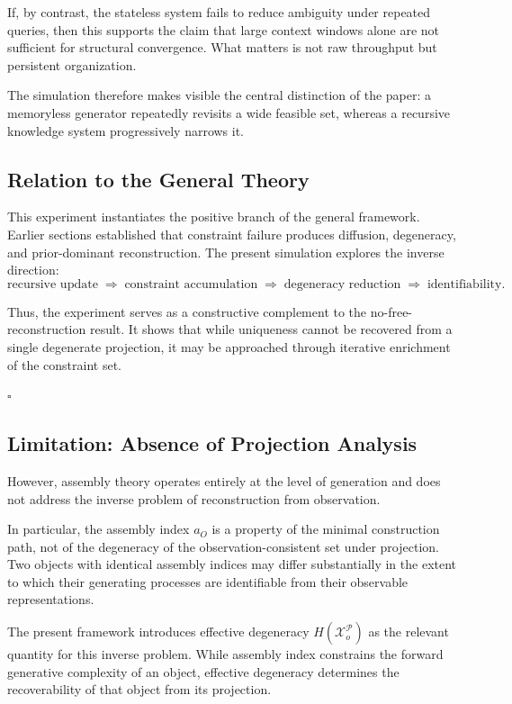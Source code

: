 \documentclass[12pt, oneside]{article}
\theoremstyle{plain}
\theoremstyle{definition}
\theoremstyle{remark}
\newcommand{\config}{\mathcal{X}}
\newcommand{\prior}{\mathcal{P}}
\begin{document}
If, by contrast, the stateless system fails to reduce ambiguity under repeated queries, then this supports the claim that large context windows alone are not sufficient for structural convergence. What matters is not raw throughput but persistent organization.

The simulation therefore makes visible the central distinction of the paper: a memoryless generator repeatedly revisits a wide feasible set, whereas a recursive knowledge system progressively narrows it.

\subsection{Relation to the General Theory}

This experiment instantiates the positive branch of the general framework. Earlier sections established that constraint failure produces diffusion, degeneracy, and prior-dominant reconstruction. The present simulation explores the inverse direction:
\[
\text{recursive update} \;\Rightarrow\; \text{constraint accumulation} \;\Rightarrow\; \text{degeneracy reduction} \;\Rightarrow\; \text{identifiability}.
\]

Thus, the experiment serves as a constructive complement to the no-free-reconstruction result. It shows that while uniqueness cannot be recovered from a single degenerate projection, it may be approached through iterative enrichment of the constraint set.

\hfill $\square$

\subsection{Limitation: Absence of Projection Analysis}

However, assembly theory operates entirely at the level of generation and does not
address the inverse problem of reconstruction from observation.

In particular, the assembly index $a_O$ is a property of the minimal construction
path, not of the degeneracy of the observation-consistent set under projection.
Two objects with identical assembly indices may differ substantially in the extent
to which their generating processes are identifiable from their observable
representations.

The present framework introduces effective degeneracy $H(\config_o^{\prior})$ as
the relevant quantity for this inverse problem. While assembly index constrains
the forward generative complexity of an object, effective degeneracy determines
the recoverability of that object from its projection.
\end{document}
